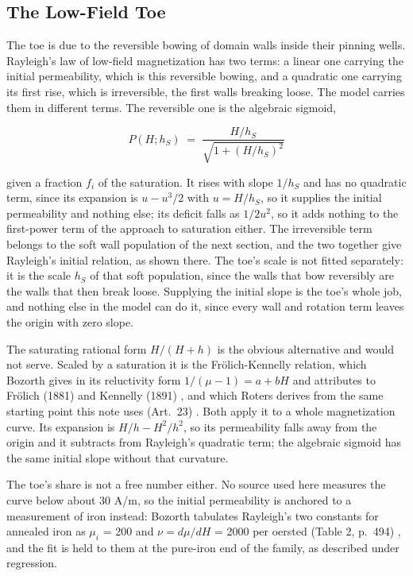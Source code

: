 \documentclass[
  11pt,
]{article}
\begin{document}
\subsection{The Low-Field Toe}\label{the-low-field-toe}

The toe is due to the reversible bowing of domain walls inside their pinning wells. Rayleigh's law of low-field magnetization \cite{wiki-rayleigh} has two terms: a linear one carrying the initial permeability, which is this reversible bowing, and a quadratic one carrying its first rise, which is irreversible, the first walls breaking loose. The model carries them in different terms. The reversible one is the algebraic sigmoid,

\begin{equation}\label{eq:toe}
P(H;h_S) \;=\; \frac{H/h_S}{\sqrt{1+(H/h_S)^{2}}}
\end{equation}

given a fraction \(f_i\) of the saturation. It rises with slope \(1/h_S\) and has no quadratic term, since its expansion is \(u - u^{3}/2\) with \(u = H/h_S\), so it supplies the initial permeability and nothing else; its deficit falls as \(1/2u^{2}\), so it adds nothing to the first-power term of the approach to saturation either. The irreversible term belongs to the soft wall population of the next section, and the two together give Rayleigh's initial relation, as shown there. The toe's scale is not fitted separately: it is the scale \(h_S\) of that soft population, since the walls that bow reversibly are the walls that then break loose. Supplying the initial slope is the toe's whole job, and nothing else in the model can do it, since every wall and rotation term leaves the origin with zero slope.

The saturating rational form \(H/(H+h)\) is the obvious alternative and would not serve. Scaled by a saturation it is the Frölich-Kennelly relation, which Bozorth gives in its reluctivity form \(1/(\mu-1) = a + bH\) and attributes to Frölich (1881) and Kennelly (1891) \cite{bozorth1951}, and which Roters derives from the same starting point this note uses (Art.~23) \cite{roters1941}. Both apply it to a whole magnetization curve. Its expansion is \(H/h - H^{2}/h^{2}\), so its permeability falls away from the origin and it subtracts from Rayleigh's quadratic term; the algebraic sigmoid has the same initial slope without that curvature.

The toe's share is not a free number either. No source used here measures the curve below about 30 A/m, so the initial permeability is anchored to a measurement of iron instead: Bozorth tabulates Rayleigh's two constants for annealed iron as \(\mu_i\) = 200 and \(\nu = d\mu/dH\) = 2000 per oersted (Table 2, p.~494) \cite{bozorth1951}, and the fit is held to them at the pure-iron end of the family, as described under regression.
\end{document}

